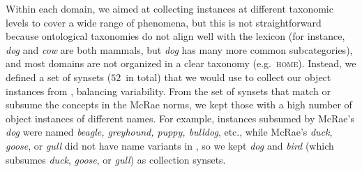 Within each domain, we aimed at collecting instances at different taxonomic levels  to cover a wide range of phenomena, but this is not straightforward because ontological taxonomies do not align well with the lexicon (for instance, \textit{dog} and \textit{cow} are both mammals, but \textit{dog} has many more common subcategories), and most domains are not organized in a clear taxonomy %
(e.g.\ \textsc{home}).
Instead, we defined a set of synsets ($52$\ in total) that we would use to collect our object instances from \vg, balancing variability.
From the set of synsets that match or subsume the concepts in the McRae norms, we kept those with a high number of \vg object instances of different names.
For example, \vg instances subsumed by McRae's \textsl{dog} were named \textsl{beagle, greyhound, puppy, bulldog}, etc., while McRae's \textsl{duck}, \textsl{goose}, or \textsl{gull} did not have name variants in \vg, so we kept \textsl{dog} and \textsl{bird} (which subsumes \textsl{duck}, \textsl{goose}, or \textsl{gull}) as collection synsets.

